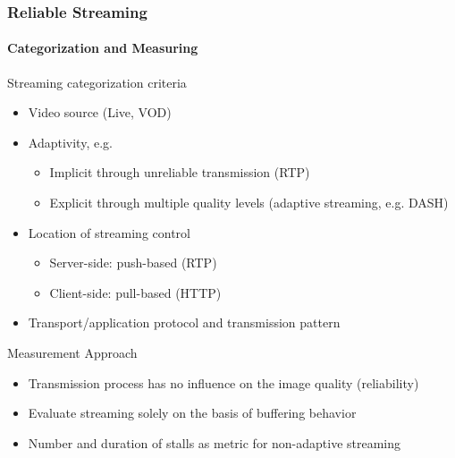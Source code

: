 \documentclass{beamer}
\begin{document}
\begin{frame}
	\frametitle{Reliable Streaming}
	\framesubtitle{Categorization and Measuring}

	\begin{overlayarea}{\textwidth}{\textheight}
		Streaming categorization criteria
		\begin{itemize}
			\item Video source (Live, VOD)
			\item Adaptivity, e.g.
				\begin{itemize}
					\item Implicit through unreliable transmission (RTP)
					\item Explicit through multiple quality levels (adaptive streaming, e.g. DASH)
				\end{itemize}
			\item Location of streaming control
				\begin{itemize}
					\item Server-side: push-based (RTP)
					\item Client-side: pull-based (HTTP)
				\end{itemize}
			\item Transport/application protocol and transmission pattern
		\end{itemize}



		\pause
		\begin{block}{Measurement Approach}
		\begin{itemize}
			\item Transmission process has no influence on the image quality (reliability)
			\item Evaluate streaming solely on the basis of buffering behavior
			\item Number and duration of stalls as metric for non-adaptive streaming
		\end{itemize}
		\end{block}
	\end{overlayarea}
\end{frame}
\end{document}

